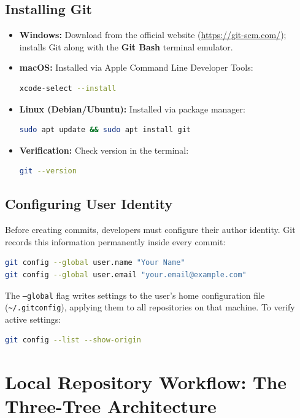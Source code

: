 \subsection{Installing Git}
\begin{itemize}[leftmargin=1.2em]
    \item \textbf{Windows:} Download from the official website (\url{https://git-scm.com/}); installs Git along with the \textbf{Git Bash} terminal emulator.
    \item \textbf{macOS:} Installed via Apple Command Line Developer Tools:
    \begin{lstlisting}[language=bash]
xcode-select --install
    \end{lstlisting}
    \item \textbf{Linux (Debian/Ubuntu):} Installed via package manager:
    \begin{lstlisting}[language=bash]
sudo apt update && sudo apt install git
    \end{lstlisting}
    \item \textbf{Verification:} Check version in the terminal:
    \begin{lstlisting}[language=bash]
git --version
    \end{lstlisting}
\end{itemize}

\subsection{Configuring User Identity}
Before creating commits, developers must configure their author identity. Git records this information permanently inside every commit:
\begin{lstlisting}[language=bash]
git config --global user.name "Your Name"
git config --global user.email "your.email@example.com"
\end{lstlisting}
The \texttt{--global} flag writes settings to the user's home configuration file (\texttt{\textasciitilde/.gitconfig}), applying them to all repositories on that machine. To verify active settings:
\begin{lstlisting}[language=bash]
git config --list --show-origin
\end{lstlisting}

\section{Local Repository Workflow: The Three-Tree Architecture}

